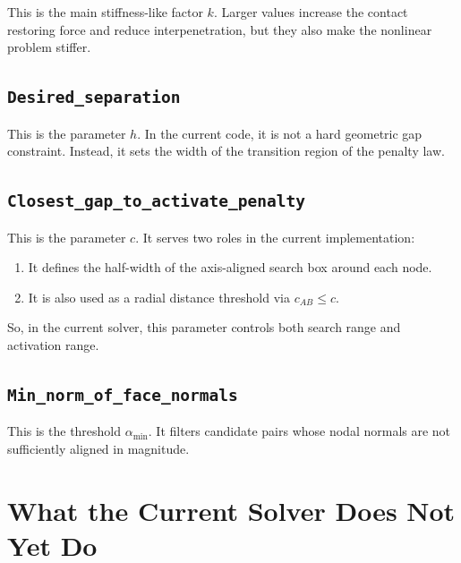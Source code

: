 \documentclass[11pt]{article}
\begin{document}
This is the main stiffness-like factor $k$. Larger values increase the contact restoring force and reduce interpenetration, but they also make the nonlinear problem stiffer.

\subsection{\texttt{Desired\_separation}}

This is the parameter $h$. In the current code, it is not a hard geometric gap constraint. Instead, it sets the width of the transition region of the penalty law.

\subsection{\texttt{Closest\_gap\_to\_activate\_penalty}}

This is the parameter $c$. It serves two roles in the current implementation:
\begin{enumerate}[leftmargin=*]
\item It defines the half-width of the axis-aligned search box around each node.
\item It is also used as a radial distance threshold via $c_{AB} \le c$.
\end{enumerate}

So, in the current solver, this parameter controls both search range and activation range.

\subsection{\texttt{Min\_norm\_of\_face\_normals}}

This is the threshold $\alpha_{\min}$. It filters candidate pairs whose nodal normals are not sufficiently aligned in magnitude.

\section{What the Current Solver Does Not Yet Do}
\end{document}
